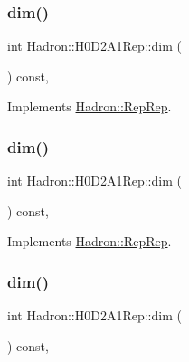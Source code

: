 \subsubsection{\texorpdfstring{dim()}{dim()}\hspace{0.1cm}{\footnotesize\ttfamily [3/5]}}
{\footnotesize\ttfamily int Hadron\+::\+H0\+D2\+A1\+Rep\+::dim (\begin{DoxyParamCaption}{ }\end{DoxyParamCaption}) const\hspace{0.3cm}{\ttfamily [inline]}, {\ttfamily [virtual]}}



Implements \mbox{\hyperlink{structHadron_1_1RepRep_a92c8802e5ed7afd7da43ccfd5b7cd92b}{Hadron\+::\+Rep\+Rep}}.

\mbox{\label{structHadron_1_1H0D2A1Rep_ab42f651512c7614de1f9eda51cfa51be}} 
\subsubsection{\texorpdfstring{dim()}{dim()}\hspace{0.1cm}{\footnotesize\ttfamily [4/5]}}
{\footnotesize\ttfamily int Hadron\+::\+H0\+D2\+A1\+Rep\+::dim (\begin{DoxyParamCaption}{ }\end{DoxyParamCaption}) const\hspace{0.3cm}{\ttfamily [inline]}, {\ttfamily [virtual]}}



Implements \mbox{\hyperlink{structHadron_1_1RepRep_a92c8802e5ed7afd7da43ccfd5b7cd92b}{Hadron\+::\+Rep\+Rep}}.

\mbox{\label{structHadron_1_1H0D2A1Rep_ab42f651512c7614de1f9eda51cfa51be}} 
\subsubsection{\texorpdfstring{dim()}{dim()}\hspace{0.1cm}{\footnotesize\ttfamily [5/5]}}
{\footnotesize\ttfamily int Hadron\+::\+H0\+D2\+A1\+Rep\+::dim (\begin{DoxyParamCaption}{ }\end{DoxyParamCaption}) const\hspace{0.3cm}{\ttfamily [inline]}, {\ttfamily [virtual]}}



